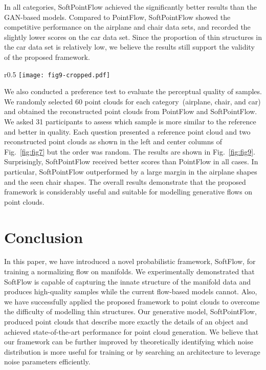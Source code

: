 \documentclass{article}
\begin{document}
In all categories, SoftPointFlow achieved the significantly better results than the GAN-based models. Compared to PointFlow, SoftPointFlow showed the competitive performance on the airplane and chair data sets, and recorded the slightly lower scores on the car data set. Since the proportion of thin structures in the car data set is relatively low, we believe the results still support the validity of the proposed framework.

\begin{wrapfigure}{r}{0.5\textwidth}
	\vskip -10pt
	\centering
	\texttt{[image: fig9-cropped.pdf]}
    \caption{Results on preference test.}
	\label{fig:fig9}
\end{wrapfigure}
We also conducted a preference test to evaluate the perceptual quality of samples. We randomly selected 60 point clouds for each category~(airplane, chair, and car) and obtained the reconstructed point clouds from PointFlow and SoftPointFlow. We asked 31 participants to assess which sample is more similar to the reference and better in quality. Each question presented a reference point cloud and two reconstructed point clouds as shown in the left and center columns of Fig.~\ref{fig:fig7} but the order was random. The results are shown in Fig.~\ref{fig:fig9}. Surprisingly, SoftPointFlow received better scores than PointFlow in all cases. In particular, SoftPointFlow outperformed by a large margin in the airplane shapes and the seen chair shapes. The overall results demonstrate that the proposed framework is considerably useful and suitable for modelling generative flows on point clouds. 


\section{Conclusion}
In this paper, we have introduced a novel probabilistic framework, SoftFlow, for training a normalizing flow on manifolds. We experimentally demonstrated that SoftFlow is capable of capturing the innate structure of the manifold data and produces high-quality samples while the current flow-based models cannot. Also, we have successfully applied the proposed framework to point clouds to overcome the difficulty of modelling thin structures. Our generative model, SoftPointFlow, produced point clouds that describe more exactly the details of an object and achieved state-of-the-art performance for point cloud generation. We believe that our framework can be further improved by theoretically identifying which noise distribution is more useful for training or by searching an architecture to leverage noise parameters efficiently.
\end{document}

